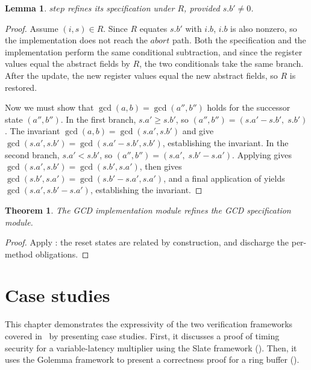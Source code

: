 \documentclass[fontset=fira-newtxsf]{mitthesis}
\theoremstyle{definition}
\theoremstyle{plain}
\newtheorem{lemma}{Lemma}[section]
\newtheorem{theorem}{Theorem}[section]
\begin{document}
\begin{lemma} \label{lem:gcd-step-refines}
$\mathit{step}$ refines its specification under $R$, provided $s.b' \neq 0$.
\end{lemma}

\begin{proof}[Proof]
Assume $(i, s) \in R$.
Since $R$ equates $s.b'$ with $i.b$, $i.b$ is also nonzero, so the implementation does not reach the $\mathit{abort}$ path.
Both the specification and the implementation perform the same conditional subtraction, and since the register values equal the abstract fields by $R$, the two conditionals take the same branch.
After the update, the new register values equal the new abstract fields, so $R$ is restored.

Now we must show that $\gcd(a, b) = \gcd(a'', b'')$ holds for the successor state $(a'', b'')$.
In the first branch, $s.a' \geq s.b'$, so $(a'', b'') = (s.a' - s.b',\; s.b')$.
The invariant $\gcd(a,b) = \gcd(s.a', s.b')$ and  give $\gcd(s.a', s.b') = \gcd(s.a' - s.b', s.b')$, establishing the invariant.
In the second branch, $s.a' < s.b'$, so $(a'', b'') = (s.a',\; s.b' - s.a')$.
Applying  gives $\gcd(s.a', s.b') = \gcd(s.b', s.a')$, then  gives $\gcd(s.b', s.a') = \gcd(s.b' - s.a', s.a')$, and a final application of  yields $\gcd(s.a', s.b' - s.a')$, establishing the invariant.
\end{proof}

\begin{theorem} \label{thm:gcd-correct}
The GCD implementation module refines the GCD specification module.
\end{theorem}

\begin{proof}[Proof]
Apply : the reset states are related by construction, and  discharge the per-method obligations.
\end{proof}

\chapter{Case studies} \label{chap:cases}
This chapter demonstrates the expressivity of the two verification frameworks covered in~ by presenting case studies. First, it discusses a proof of timing security for a variable-latency multiplier using the Slate framework (). Then, it uses the Golemma framework to present a correctness proof for a ring buffer ().
\end{document}
